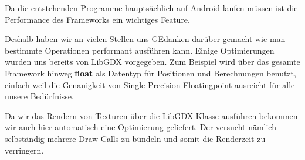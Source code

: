 Da die entstehenden Programme hauptsächlich auf Android laufen müssen ist die Performance des Frameworks ein wichtiges Feature.

Deshalb haben wir an vielen Stellen uns GEdanken darüber gemacht wie man bestimmte Operationen performant ausführen kann. Einige Optimierungen wurden uns bereits von LibGDX vorgegeben. Zum Beispiel wird über das gesamte Framework hinweg \textbf{float} als Datentyp für Positionen und Berechnungen benutzt, einfach weil die Genauigkeit von Single-Precision-Floatingpoint ausreicht für alle unsere Bedürfnisse.

Da wir das Rendern von Texturen über die LibGDX Klasse  ausführen bekommen wir auch hier automatisch eine Optimierung geliefert. Der  versucht nämlich selbständig mehrere Draw Calls zu bündeln und somit die Renderzeit zu verringern.

